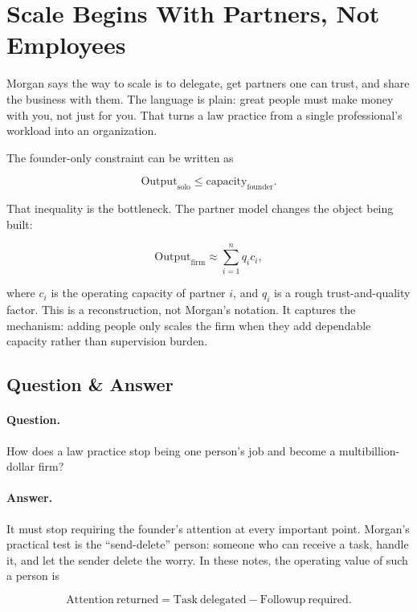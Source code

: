 \section{Scale Begins With Partners, Not Employees}

Morgan says the way to scale is to delegate, get partners one can trust, and share the business with them. The language is plain: great people must make money with you, not just for you. That turns a law practice from a single professional's workload into an organization.

The founder-only constraint can be written as

\begin{equation}
\mathrm{Output}_{\mathrm{solo}}
\leq
\mathrm{capacity}_{\mathrm{founder}}.
\end{equation}

That inequality is the bottleneck. The partner model changes the object being built:

\begin{equation}
\mathrm{Output}_{\mathrm{firm}}
\approx
\sum_{i=1}^{n} q_i c_i,
\end{equation}

where \(c_i\) is the operating capacity of partner \(i\), and \(q_i\) is a rough trust-and-quality factor. This is a reconstruction, not Morgan's notation. It captures the mechanism: adding people only scales the firm when they add dependable capacity rather than supervision burden.

\subsection{Question \& Answer}

\paragraph{Question.}
How does a law practice stop being one person's job and become a multibillion-dollar firm?

\paragraph{Answer.}
It must stop requiring the founder's attention at every important point. Morgan's practical test is the ``send-delete'' person: someone who can receive a task, handle it, and let the sender delete the worry. In these notes, the operating value of such a person is

\begin{equation}
\mathrm{Attention\ returned}
=
\mathrm{Task\ delegated}
-
\mathrm{Followup\ required}.
\end{equation}

